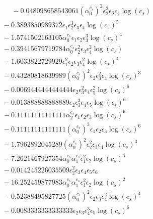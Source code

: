 \documentclass[10pt]{article}
\begin{document}
\begin{align*}
\phantom{F_{s,6}} &\phantom{={}}{}  - 0.048098658543061 \left(\alpha_{0}^{c_s}\right)^{2} \epsilon_{2}^{2} \epsilon_{3} \epsilon_{4} \log{\left(c_{s} \right)} \\
&{}  - 0.3893850989372 \epsilon_{1} \epsilon_{2}^{3} \epsilon_{3} \epsilon_{4} \log{\left(c_{s} \right)}^{5} \\
&{}  - 1.5741502163105 \alpha_{0}^{c_s} \epsilon_{1} \epsilon_{2} \epsilon_{3}^{3} \log{\left(c_{s} \right)}^{4} \\
&{}  - 0.39415679719784 \alpha_{0}^{c_s} \epsilon_{2}^{2} \epsilon_{3} \epsilon_{4}^{2} \log{\left(c_{s} \right)} \\
&{}  - 1.6033822729929 \epsilon_{1}^{2} \epsilon_{2} \epsilon_{3} \epsilon_{4}^{2} \log{\left(c_{s} \right)}^{4} \\
&{}  - 0.43280818639989 \left(\alpha_{0}^{c_s}\right)^{2} \epsilon_{2} \epsilon_{3}^{2} \epsilon_{4} \log{\left(c_{s} \right)}^{3} \\
&{}  - 0.0069444444444444 \epsilon_{2} \epsilon_{3}^{2} \epsilon_{4} \epsilon_{5}^{2} \log{\left(c_{s} \right)}^{6} \\
&{}  - 0.013888888888889 \epsilon_{2} \epsilon_{3}^{3} \epsilon_{4} \epsilon_{5} \log{\left(c_{s} \right)}^{6} \\
&{}  - 0.11111111111111 \alpha_{2}^{c_s} \epsilon_{1} \epsilon_{2} \epsilon_{3} \log{\left(c_{s} \right)}^{6} \\
&{}  - 0.11111111111111 \left(\alpha_{0}^{c_s}\right)^{3} \epsilon_{1} \epsilon_{2} \epsilon_{3} \log{\left(c_{s} \right)}^{6} \\
&{}  - 1.7962892045289 \left(\alpha_{0}^{c_s}\right)^{2} \epsilon_{2}^{2} \epsilon_{3} \epsilon_{4} \log{\left(c_{s} \right)}^{3} \\
&{}  - 7.2621467927354 \alpha_{0}^{c_s} \alpha_{1}^{c_s} \epsilon_{1}^{2} \epsilon_{2} \log{\left(c_{s} \right)}^{4} \\
&{}  - 0.014245226035509 \epsilon_{2}^{2} \epsilon_{3} \epsilon_{4} \epsilon_{5} \epsilon_{6} \\
&{}  - 16.252459877983 \alpha_{0}^{c_s} \alpha_{1}^{c_s} \epsilon_{1}^{2} \epsilon_{2} \log{\left(c_{s} \right)}^{2} \\
&{}  - 0.52388495827725 \left(\alpha_{0}^{c_s}\right)^{2} \epsilon_{2} \epsilon_{3} \epsilon_{4}^{2} \log{\left(c_{s} \right)}^{4} \\
&{}  - 0.0083333333333333 \epsilon_{2} \epsilon_{3} \epsilon_{4}^{3} \epsilon_{5} \log{\left(c_{s} \right)}^{6} \\

\end{align*}
\end{document}
